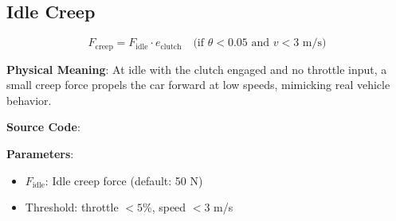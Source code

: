 \subsection{Idle Creep}

\begin{equation}
  F_{\text{creep}} = F_{\text{idle}} \cdot e_{\text{clutch}} \quad \text{(if } \theta < 0.05 \text{ and } v < 3 \text{ m/s)}
  \label{eq:idle-creep}
\end{equation}

\textbf{Physical Meaning}: At idle with the clutch engaged and no throttle input, a small creep force propels the car forward at low speeds, mimicking real vehicle behavior.

\textbf{Source Code}: 

\textbf{Parameters}:
\begin{itemize}
  \item $F_{\text{idle}}$: Idle creep force (default: 50 N)
  \item Threshold: throttle $< 5\%$, speed $< 3$ m/s
\end{itemize}

\newpage
